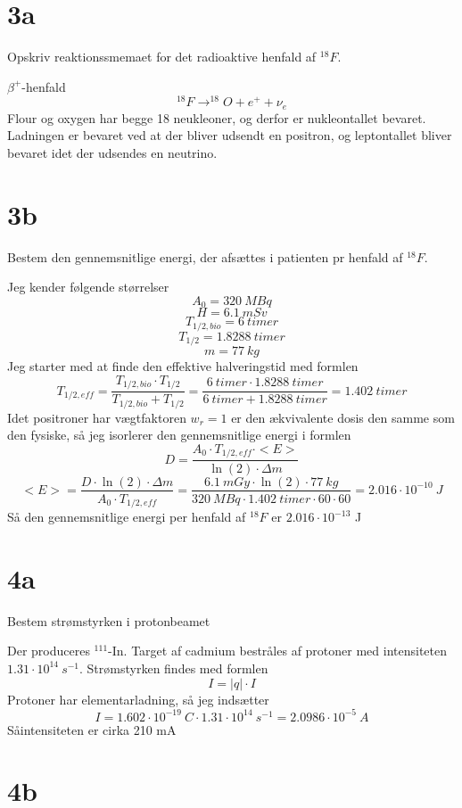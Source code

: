 \documentclass[12pt]{article}
\begin{document}
\section*{3a}

Opskriv reaktionssmemaet for det radioaktive henfald af $^{18}F$.

$\beta^+$-henfald
$$^{18}F \rightarrow ^{18}O + e^+ + \nu _e$$
Flour og oxygen har begge 18 neukleoner, og derfor er nukleontallet bevaret. Ladningen er bevaret ved at der bliver udsendt en positron, og leptontallet bliver bevaret idet der udsendes en neutrino.

\section*{3b}

Bestem den gennemsnitlige energi, der afsættes i patienten pr henfald af $^{18}F$.

Jeg kender følgende størrelser
$$A_0 = 320\ MBq$$
$$H = 6.1\ mSv$$
$$T_{1/2,bio}=6\ timer$$
$$T_{1/2} = 1.8288\ timer$$
$$m = 77\ kg$$
Jeg starter med at finde den effektive halveringstid med formlen
$$T_{1/2,eff} = \frac{T_{1/2,bio}\cdot T_{1/2}}{T_{1/2,bio}+T_{1/2}} = \frac{6\ timer\cdot 1.8288\ timer}{6\ timer + 1.8288\ timer} = 1.402\ timer$$
Idet positroner har vægtfaktoren $w_r = 1$ er den ækvivalente dosis den samme som den fysiske, så jeg isorlerer den gennemsnitlige energi i formlen
$$D = \frac{A_0\cdot T_{1/2,eff}\cdot <E>}{\ln(2)\cdot \Delta m}$$
$$<E> = \frac{D\cdot \ln(2)\cdot \Delta m}{A_0\cdot T_{1/2,eff}} = \frac{6.1\ mGy\cdot \ln(2)\cdot 77\ kg}{320\ MBq\cdot 1.402\ timer \cdot 60 \cdot 60} = 2.016\cdot 10^{-10}\ J$$
Så den gennemsnitlige energi per henfald af $^{18}F$ er $2.016\cdot 10^{-13}$ J

\section*{4a}

Bestem strømstyrken i protonbeamet

Der produceres $^111$-In. Target af cadmium bestråles af protoner med intensiteten $1.31\cdot 10^{14}\ s^{-1}$.
Strømstyrken findes med formlen
$$I = |q| \cdot I$$
Protoner har elementarladning, så jeg indsætter
$$I = 1.602\cdot 10^{-19}\ C\cdot 1.31\cdot 10^{14}\ s^{-1} = 2.0986\cdot 10^{-5}\ A$$
Såintensiteten er cirka 210 mA

\section*{4b}
\end{document}
